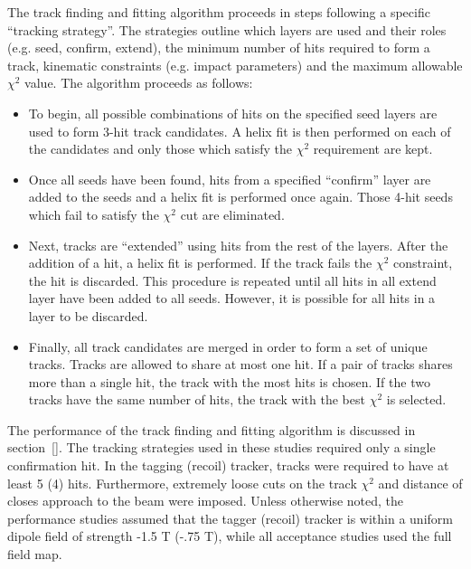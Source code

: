The track finding and fitting algorithm proceeds in steps following a specific 
``tracking strategy''.  The strategies outline which layers are used and their
roles (e.g. seed, confirm, extend), 
the minimum number of hits required to form a track, kinematic constraints
(e.g. impact parameters) and the maximum allowable $\chi^2$ value. The algorithm
proceeds as follows:
\begin{itemize}
    \item To begin, all possible combinations of hits on the specified seed 
          layers are used to form 3-hit track candidates.  A helix fit is then 
          performed on each of the candidates and only those which satisfy the
          $\chi^2$ requirement are kept.
    \item Once all seeds have been found, hits from a specified ``confirm'' 
          layer are added to the seeds and a helix fit is performed once again.
          Those 4-hit seeds which fail to satisfy the $\chi^2$ cut are eliminated.
    \item Next, tracks are ``extended'' using hits from the rest of the layers.
          After the addition of a hit, a helix fit is performed.  If the track
          fails the $\chi^2$ constraint, the hit is discarded.  This procedure
          is repeated until all hits in all extend layer have been added to all seeds. 
          However, it is possible for all hits in a layer to be discarded.
    \item Finally, all track candidates are merged in order to form a set of unique 
          tracks.  Tracks are allowed to share at most one hit.  If a pair of
          tracks shares more than a single hit, the track with the most hits is
          chosen.  If the two tracks have the same number of hits, the track 
          with the best $\chi^2$  is selected.
\end{itemize}

The performance of the track finding and fitting algorithm is discussed in 
section~\ref{}.  The tracking strategies used in these studies required only 
a single confirmation hit.  In the tagging (recoil) tracker, tracks were 
required to have at least 5 (4) hits. Furthermore, extremely loose cuts on the
track $\chi^2$ and distance of closes approach to the beam were imposed. 
Unless otherwise noted, the performance studies assumed that the 
tagger (recoil) tracker is within a uniform dipole field of strength -1.5 T 
(-.75 T), while all acceptance studies used the full field map.

